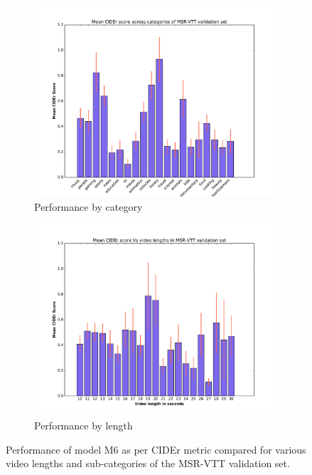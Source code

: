 \begin{figure}[ht]
\begin{center}
  \begin{adjustbox}{center}
  \begin{subfigure}[c]{0.65\linewidth}
    \centering
    \includegraphics[width=1.0\linewidth]{images/VTTCiderCateg.pdf}%
    \caption{Performance by category}%
    \label{fig:VttCategPerf}
  \end{subfigure}%
  \begin{subfigure}[c]{0.65\linewidth}
    \centering
    \includegraphics[width=1.0\linewidth]{images/VTTCiderLengths.pdf}
    \caption{Performance by length}
    \label{fig:VttLenPerf}
  \end{subfigure}
  \end{adjustbox}
\end{center}
\vspace*{-5mm}
\caption{Performance of model M6 as per CIDEr metric compared for
        various video lengths and sub-categories of the MSR-VTT validation set.}
\label{fig:VttPerf}
\end{figure}

